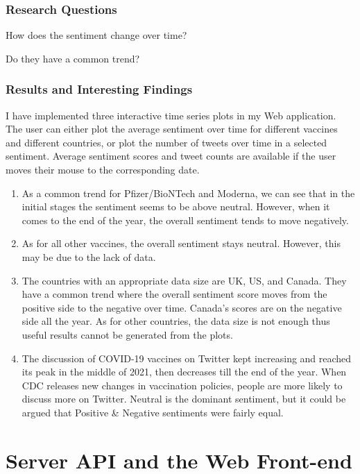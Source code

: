 \documentclass{article}
\begin{document}
\subsubsection{Research Questions}

How does the sentiment change over time?

Do they have a common trend?

\subsubsection{Results and Interesting Findings}

I have implemented three interactive time series plots in my Web application. The user can either plot the average sentiment over time for different vaccines and different countries, or plot the number of tweets over time in a selected sentiment. Average sentiment scores and tweet counts are available if the user moves their mouse to the corresponding date. 

\begin{enumerate}
    \item As a common trend for Pfizer/BioNTech and Moderna, we can see that in the initial stages the sentiment seems to be above neutral. However, when it comes to the end of the year, the overall sentiment tends to move negatively.
    \item As for all other vaccines, the overall sentiment stays neutral. However, this may be due to the lack of data.
    \item The countries with an appropriate data size are UK, US, and Canada. They have a common trend where the overall sentiment score moves from the positive side to the negative over time. Canada's scores are on the negative side all the year. As for other countries, the data size is not enough thus useful results cannot be generated from the plots.
    \item The discussion of COVID-19 vaccines on Twitter kept increasing and reached its peak in the middle of 2021, then decreases till the end of the year. When CDC releases new changes in vaccination policies, people are more likely to discuss more on Twitter. Neutral is the dominant sentiment, but it could be argued that Positive & Negative sentiments were fairly equal.
\end{enumerate}

\section{Server API and the Web Front-end}
\end{document}
